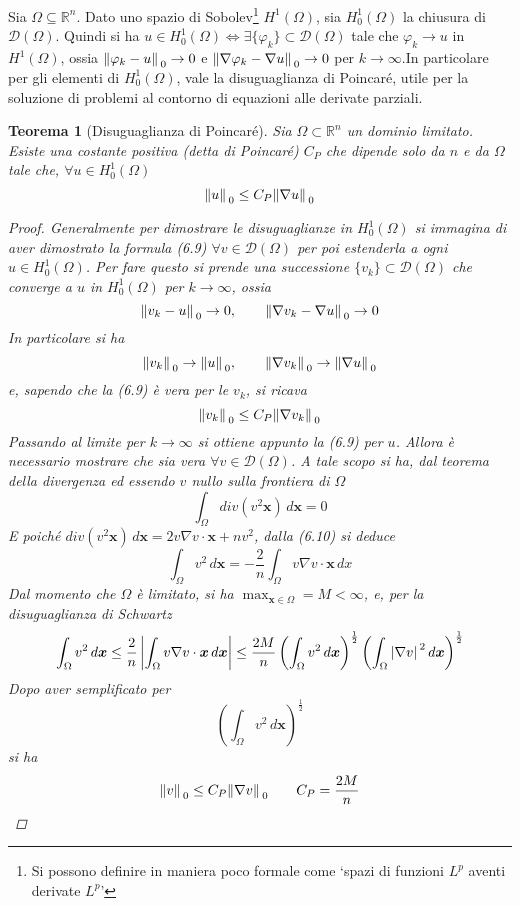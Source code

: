 \documentclass[a4paper,12pt, draft]{article}
\theoremstyle{break}
\newtheorem{theorem}{Teorema}[section]
\let\phi\varphi
\numberwithin{equation}{section}
\begin{document}
Sia \(\Omega \subseteq \mathbb{R}^n\). Dato uno spazio di Sobolev\footnote{Si possono definire in maniera poco formale come `spazi di funzioni \(L^p\) aventi derivate \(L^p\)'} \(H^1(\Omega)\), sia \(H^1_0(\Omega)\) la chiusura di \(\mathcal{D}(\Omega)\). Quindi si ha \(u \in H^1_0(\Omega) \Leftrightarrow \exists \{\phi_k\}\subset \mathcal{D}(\Omega)\) tale che \(\phi_k \to u\) in \(H^1(\Omega)\), ossia \(\norm*{\phi_k - u}_0 \to 0\) e \(\norm*{\nabla\phi_k - \nabla u}_0 \to 0\) per \(k \to \infty\).In particolare per gli elementi di \(H^1_0(\Omega)\), vale la disuguaglianza di Poincaré, utile per la soluzione di problemi al contorno di equazioni alle derivate parziali.
\begin{theorem}[Disuguaglianza di Poincaré]
  Sia \(\Omega \subset \mathbb{R}^n\) un dominio limitato. Esiste una costante positiva (detta di Poincaré) \(C_P\) che dipende solo da \(n\) e da \(\Omega\) tale che, \(\forall u \in H^1_0(\Omega)\)
  \begin{equation}
    \norm*{u}_0 \leq C_P \norm*{\nabla u}_0
  \end{equation}
  \begin{proof}
    Generalmente per dimostrare le disuguaglianze in \(H^1_0(\Omega)\) si immagina di aver dimostrato la formula (6.9) \(\forall v \in \mathcal{D}(\Omega)\) per poi estenderla a ogni \(u \in H^1_0(\Omega)\). Per fare questo si prende una successione \(\{v_k\} \subset \mathcal{D}(\Omega)\) che converge a \(u\) in \(H^1_0(\Omega)\) per \(k \to \infty \), ossia 
    \[
      \norm*{v_k - u}_0 \to 0, \qquad \norm*{\nabla v_k - \nabla u}_0 \to 0
    \]
    In particolare si ha 
    \[
    \norm*{v_k}_0 \to \norm*{u}_0, \qquad \norm*{\nabla v_k}_0 \to \norm*{\nabla u}_0
    \]
    e, sapendo che la (6.9) è vera per le \(v_k\), si ricava
    \[
      \norm*{v_k}_0 \leq C_P \norm*{\nabla v_k}_0
    \]
    Passando al limite per \(k \to \infty\) si ottiene appunto la (6.9) per \(u\). Allora è necessario mostrare che sia vera \(\forall v \in \mathcal{D}(\Omega)\). A tale scopo si ha, dal teorema della divergenza ed essendo \(v\) nullo sulla frontiera di \(\Omega\)
    \begin{equation}
      \int_{\Omega} div(v^2\bm{x}) \, d\bm{x} = 0
    \end{equation}
    E poiché \(div(v^2\bm{x})\,d\bm{x} = 2v\nabla v \cdot \bm{x} + nv^2\), dalla (6.10) si deduce 
    \[
      \int_{\Omega} v^2\, d\bm{x} = -\frac{2}{n} \int_{\Omega} v\nabla v \cdot \bm{x} \, dx
    \]
    Dal momento che \(\Omega\) è limitato, si ha {\everymath{\displaystyle}\(\max_{\bm{x} \in \Omega} = M < \infty\)}, e, per la disuguaglianza di Schwartz
    \[
    \int_{\Omega} v^2 \, d\bm{x} \leq \frac{2}{n}\left|\int_{\Omega} v\nabla v \cdot \bm{x} \, d\bm{x} \right| \leq \frac{2M}{n}\left(\int_{\Omega} v^2 \, d\bm{x}\right)^{\frac{1}{2}}\left(\int_{\Omega} \abs*{\nabla v}^2 \, d\bm{x}\right)^{\frac{1}{2}}  
    \]
  Dopo aver semplificato per 
  \[
  \left(\int_{\Omega} v^2 \, d\bm{x}\right)^{\frac{1}{2}}  
  \]
  si ha 
  \[
  \norm*{v}_0 \leq C_P \norm*{\nabla v}_0 \qquad C_P = \frac{2M}{n}  
  \]
  \end{proof}
\end{theorem}
\end{document}
